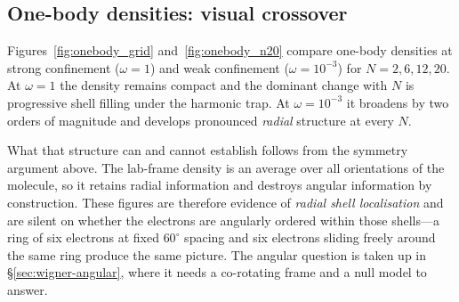 \subsection{One-body densities: visual crossover}
\label{sec:wigner-onebody}

Figures~\ref{fig:onebody_grid} and~\ref{fig:onebody_n20} compare one-body
densities at strong confinement ($\omega=1$) and weak confinement
($\omega=10^{-3}$) for $N=2,6,12,20$.
At $\omega=1$ the density remains compact and the dominant change with $N$ is
progressive shell filling under the harmonic trap. At $\omega=10^{-3}$ it broadens by two
orders of magnitude and develops pronounced \emph{radial} structure at every $N$.

What that structure can and cannot establish follows from the symmetry argument above. The
lab-frame density is an average over all orientations of the molecule, so it retains radial
information and destroys angular information by construction. These figures are therefore
evidence of \emph{radial shell localisation} and are silent on whether the electrons are
angularly ordered within those shells---a ring of six electrons at fixed $60^\circ$ spacing
and six electrons sliding freely around the same ring produce the same picture. The angular
question is taken up in \S\ref{sec:wigner-angular}, where it needs a co-rotating frame and a
null model to answer.

